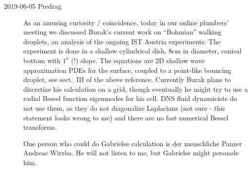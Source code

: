 \begin{description}
\item[2019-06-05 Predrag]
As an amusing curiosity / coincidence, today in our online plumbers'
meeting we discussed Burak's current work on ``Bohmian'' walking
droplets, an analysis of the ongoing IST Austria
experiments. The experiment is done in a shallow cylindrical dish, 8cm in
diameter, conical bottom with $1^o$ (!) slope. The equations are 2D
shallow wave approximation PDEs for the surface, coupled to a point-like
bouncing droplet, see sect.~III of the above reference. Currently Burak
plans to discretize his calculation on a grid, though eventually he might
try to use a radial Bessel function eigenmodes for his cell. DNS fluid
dynamicists do not use them, as they do not diagonalize Laplacians (not
sure - this statement looks wrong to me) and there are no fast numerical
Bessel transforms.

One person who could do Gabrielse calculation is der menschliche Panzer
Andreas Wirzba. He will not listen to me, but Gabrielse
might persuade him.








\end{description}
